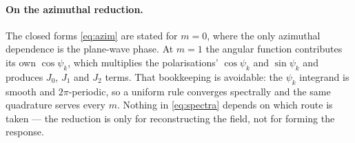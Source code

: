 \documentclass[11pt,a4paper]{article}
\begin{document}
\paragraph{On the azimuthal reduction.}  The closed forms \eqref{eq:azim} are
stated for $m=0$, where the only azimuthal dependence is the plane-wave phase.
At $m=1$ the angular function contributes its own $\cos\psi_k$, which multiplies
the polarisations' $\cos\psi_k$ and $\sin\psi_k$ and produces $J_0$, $J_1$ and
$J_2$ terms.  That bookkeeping is avoidable: the $\psi_k$ integrand is smooth
and $2\pi$-periodic, so a uniform rule converges spectrally and the same
quadrature serves every $m$.  Nothing in \eqref{eq:spectra} depends on which
route is taken --- the reduction is only for reconstructing the field, not for
forming the response.
\end{document}
